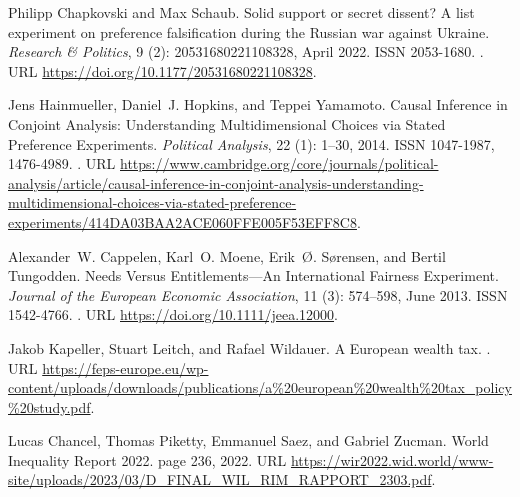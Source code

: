 \begin{thebibliography}{55}
  Philipp Chapkovski and Max Schaub.
  \newblock Solid support or secret dissent? {{A}} list experiment on preference
    falsification during the {{Russian}} war against {{Ukraine}}.
  \newblock \emph{Research \& Politics}, 9 (2):
    20531680221108328, April 2022.
  \newblock ISSN 2053-1680.
  \newblock {}.
  \newblock URL \url{https://doi.org/10.1177/20531680221108328}.
  
  Jens Hainmueller, Daniel~J. Hopkins, and Teppei Yamamoto.
  \newblock Causal {{Inference}} in {{Conjoint Analysis}}: {{Understanding
    Multidimensional Choices}} via {{Stated Preference Experiments}}.
  \newblock \emph{Political Analysis}, 22 (1): 1--30, 2014.
  \newblock ISSN 1047-1987, 1476-4989.
  \newblock {}.
  \newblock URL
    \url{https://www.cambridge.org/core/journals/political-analysis/article/causal-inference-in-conjoint-analysis-understanding-multidimensional-choices-via-stated-preference-experiments/414DA03BAA2ACE060FFE005F53EFF8C8}.
  
  Alexander~W. Cappelen, Karl~O. Moene, Erik~{\O}. S{\o}rensen, and Bertil
    Tungodden.
  \newblock Needs {{Versus Entitlements}}---{{An International Fairness
    Experiment}}.
  \newblock \emph{Journal of the European Economic Association}, 11
    (3): 574--598, June 2013.
  \newblock ISSN 1542-4766.
  \newblock {}.
  \newblock URL \url{https://doi.org/10.1111/jeea.12000}.
  
  Jakob Kapeller, Stuart Leitch, and Rafael Wildauer.
  \newblock A {{European}} wealth tax.
  .
  \newblock URL
    \url{https://feps-europe.eu/wp-content/uploads/downloads/publications/a\%20european\%20wealth\%20tax\_policy\%20study.pdf}.
  
  Lucas Chancel, Thomas Piketty, Emmanuel Saez, and Gabriel Zucman.
  \newblock World {{Inequality Report}} 2022.
  \newblock page 236, 2022.
  \newblock URL
    \url{https://wir2022.wid.world/www-site/uploads/2023/03/D\_FINAL\_WIL\_RIM\_RAPPORT\_2303.pdf}.
  

\end{thebibliography}
